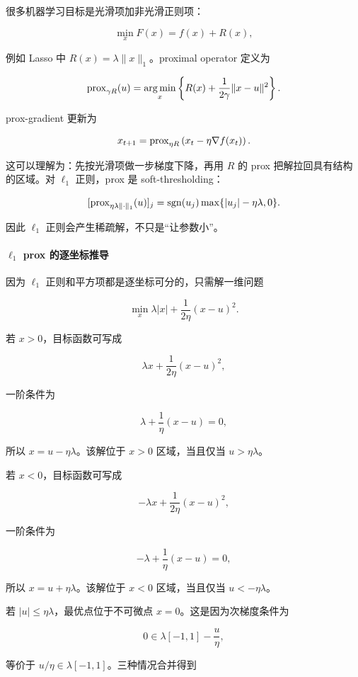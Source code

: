 
很多机器学习目标是光滑项加非光滑正则项：

\[
  \min_x F(x)=f(x)+R(x),
\]

例如 Lasso 中 \(R(x)=\lambda\|x\|_1\)。proximal operator 定义为

\[
  \operatorname{prox}_{\gamma R}(u)
  =
  \operatorname*{arg\,min}_x
  \left\{
    R(x)+\frac{1}{2\gamma}\|x-u\|^2
  \right\}.
\]

prox-gradient 更新为

\[
  x_{t+1}
  =
  \operatorname{prox}_{\eta R}
  \left(x_t-\eta\nabla f(x_t)\right).
\]

这可以理解为：先按光滑项做一步梯度下降，再用 \(R\) 的 prox 把解拉回具有结构的区域。对 \(\ell_1\) 正则，prox 是 soft-thresholding：

\[
  [\operatorname{prox}_{\eta\lambda\|\cdot\|_1}(u)]_j
  =
  \operatorname{sgn}(u_j)\max\{|u_j|-\eta\lambda,0\}.
\]

因此 \(\ell_1\) 正则会产生稀疏解，不只是“让参数小”。

\paragraph{\(\ell_1\) prox 的逐坐标推导}

因为 \(\ell_1\) 正则和平方项都是逐坐标可分的，只需解一维问题

\[
  \min_x
  \lambda |x|
  +
  \frac{1}{2\eta}(x-u)^2.
\]

若 \(x>0\)，目标函数可写成

\[
  \lambda x+\frac{1}{2\eta}(x-u)^2,
\]

一阶条件为

\[
  \lambda+\frac{1}{\eta}(x-u)=0,
\]

所以 \(x=u-\eta\lambda\)。该解位于 \(x>0\) 区域，当且仅当 \(u>\eta\lambda\)。

若 \(x<0\)，目标函数可写成

\[
  -\lambda x+\frac{1}{2\eta}(x-u)^2,
\]

一阶条件为

\[
  -\lambda+\frac{1}{\eta}(x-u)=0,
\]

所以 \(x=u+\eta\lambda\)。该解位于 \(x<0\) 区域，当且仅当 \(u<-\eta\lambda\)。

若 \(|u|\le\eta\lambda\)，最优点位于不可微点 \(x=0\)。这是因为次梯度条件为

\[
  0\in
  \lambda[-1,1]
  -
  \frac{u}{\eta},
\]

等价于 \(u/\eta\in\lambda[-1,1]\)。三种情况合并得到

